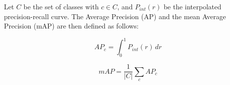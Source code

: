 \begin{definition}
\label{Def:mAP}
Let $C$ be the set of classes with $c \in C$, and $P_{int}(r)$ be the interpolated precision-recall curve. 
The Average Precision (AP) and the mean Average Precision (mAP) are then defined as follows:

\begin{equation}
\label{form:AP}
AP_c = \int_0^1 P_{int}(r)\,dr
\end{equation}

\begin{equation}
\label{form:mAP}
mAP = \frac{1}{|C|} \sum_c AP_c
\end{equation}
\end{definition}





